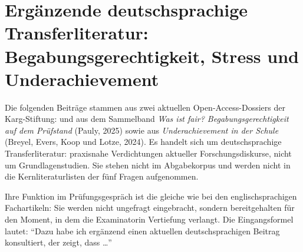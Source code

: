 \documentclass[ngerman, a4paper]{article}
\begin{document}
\section*{Ergänzende deutschsprachige Transferliteratur: Begabungsgerechtigkeit, Stress und Underachievement}
\label{sec:karg}

Die folgenden Beiträge stammen aus zwei aktuellen Open-Access-Dossiers der
Karg-Stiftung: \textcite{ahl2025begabungsgerechtigkeit} und
\textcite{koop2025herkunft} aus dem Sammelband \textit{Was ist fair?
Begabungsgerechtigkeit auf dem Prüfstand} (Pauly, 2025) sowie
\textcite{ziesenitz2024routenplan} aus \textit{Underachievement in der Schule}
(Breyel, Evers, Koop und Lotze, 2024). Es handelt sich um deutschsprachige
Transferliteratur: praxisnahe Verdichtungen aktueller Forschungsdiskurse, nicht
um Grundlagenstudien. Sie stehen nicht im Abgabekorpus und werden nicht in
die Kernliteraturlisten der fünf Fragen aufgenommen.

Ihre Funktion im Prüfungsgespräch ist die gleiche wie bei den
englischsprachigen Fachartikeln: Sie werden nicht ungefragt eingebracht, sondern
bereitgehalten für den Moment, in dem die Examinatorin Vertiefung verlangt.
Die Eingangsformel lautet: \enquote{Dazu habe ich ergänzend einen aktuellen
deutschsprachigen Beitrag konsultiert, der zeigt, dass \ldots}
\end{document}
